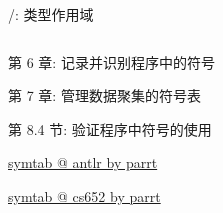 \begin{frame}{}
  \begin{center}
    /: 类型作用域
  \end{center}
  \begin{columns}
  \end{columns}
  \begin{center}
  \end{center}
\end{frame}

\begin{frame}{}
  \begin{center}
    第 6 章: 记录并识别程序中的符号


    第 7 章: 管理数据聚集的符号表
  \end{center}
\end{frame}

\begin{frame}{}
  \begin{center}

    \vspace{0.30cm}
    第 8.4 节: 验证程序中符号的使用
  \end{center}
\end{frame}

\begin{frame}{}
  \begin{center}
    \href{https://github.com/antlr/symtab}{symtab @ antlr by parrt}

    \vspace{0.80cm}
    \href{https://github.com/parrt/cs652/tree/master/lectures/code/symtab/src}{symtab @ cs652 by parrt}
  \end{center}
\end{frame}
